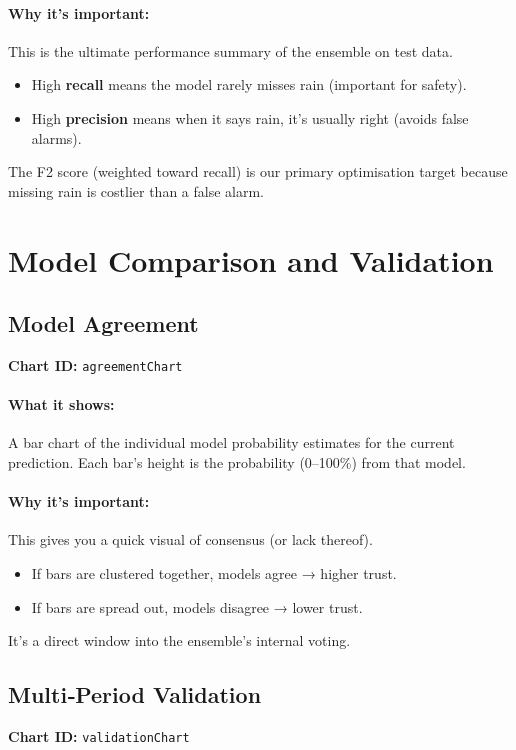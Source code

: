 \documentclass[11pt,a4paper]{article}
\begin{document}
	\paragraph{Why it’s important:}
	This is the ultimate performance summary of the ensemble on test data.
	\begin{itemize}
		\item High \textbf{recall} means the model rarely misses rain (important for safety).
		\item High \textbf{precision} means when it says rain, it’s usually right (avoids false alarms).
	\end{itemize}
	The F2 score (weighted toward recall) is our primary optimisation target because missing rain is costlier than a false alarm.
	
	\section{Model Comparison and Validation}
	
	\subsection{Model Agreement}
	\textbf{Chart ID:} \texttt{agreementChart}
	
	\paragraph{What it shows:}
	A bar chart of the individual model probability estimates for the current prediction. Each bar’s height is the probability (0–100\%) from that model.
	
	\paragraph{Why it’s important:}
	This gives you a quick visual of consensus (or lack thereof).
	\begin{itemize}
		\item If bars are clustered together, models agree → higher trust.
		\item If bars are spread out, models disagree → lower trust.
	\end{itemize}
	It’s a direct window into the ensemble’s internal voting.
	
	\subsection{Multi‑Period Validation}
	\textbf{Chart ID:} \texttt{validationChart}
	
\end{document}
